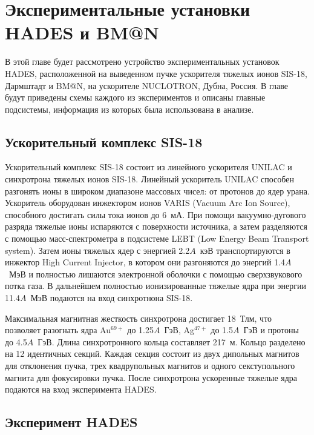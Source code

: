 \chapter{Экспериментальные установки HADES и BM@N} \label{chapt2}

В этой главе будет рассмотрено устройство экспериментальных установок HADES, расположенной на выведенном пучке ускорителя тяжелых ионов SIS-18, Дармштадт и BM@N, на ускорителе NUCLOTRON, Дубна, Россия.
В главе будут приведены схемы каждого из экспериментов и описаны главные подсистемы, информация из которых была использована в анализе.

\section{Ускорительный комплекс SIS-18}

Ускорительный комплекс SIS-18 состоит из линейного ускорителя UNILAC и синхротрона тяжелых ионов SIS-18.
Линейный ускоритель UNILAC способен разгонять ионы в широком диапазоне массовых чисел: от протонов до ядер урана.
Ускоритель оборудован инжектором ионов VARIS (Vacuum Arc Ion Source), способного достигать силы тока ионов до 6~мА.
При помощи вакуумно-дугового разряда тяжелые ионы испаряются с поверхности источника, а затем разделяются с помощью масс-спектрометра в подсистеме LEBT (Low Energy Beam Transport system).
Затем ионы тяжелых ядер с энергией 2.2$A$~кэВ транспортируются в инжектор High Current Injector, в котором они разгоняются до энергий 1.4$A$~МэВ и полностью лишаются электронной оболочки с помощью сверхзвукового потка газа.
В дальнейшем полностью ионизированные тяжелые ядра при энергии 11.4$A$~МэВ подаются на вход синхротнона SIS-18.

Максимальная магнитная жесткость синхротрона достигает 18~Тлм, что позволяет разогнать ядра Au$^{69+}$ до 1.25$A$~ГэВ, Ag$^{47+}$ до 1.5$A$~ГэВ и протоны до 4.5$A$~ГэВ.
Длина синхротронного кольца составляет 217~м.
Кольцо разделено на 12 идентичных секций.
Каждая секция состоит из двух дипольных магнитов для отклонения пучка, трех квадрупольных магнитов и одного секступольного магнита для фокусировки пучка.
После синхротрона ускоренные тяжелые ядра подаются на вход эксперимента HADES.

\section{Эксперимент HADES}

